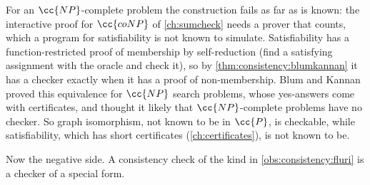 \begin{refsection}
For an $\cc{NP}$-complete problem the construction fails as far as is known: the interactive proof for $\cc{coNP}$ of \cref{ch:sumcheck} needs a prover that counts, which a program for satisfiability is not known to simulate. Satisfiability has a function-restricted proof of membership by self-reduction (find a satisfying assignment with the oracle and check it), so by \cref{thm:consistency:blumkannan} it has a checker exactly when it has a proof of non-membership. Blum and Kannan proved this equivalence for $\cc{NP}$ search problems, whose yes-answers come with certificates, and thought it likely that $\cc{NP}$-complete problems have no checker. So graph isomorphism, not known to be in $\cc{P}$, is checkable, while satisfiability, which has short certificates (\cref{ch:certificates}), is not known to be.

Now the negative side. A consistency check of the kind in \cref{obs:consistency:fluri} is a checker of a special form.



\end{refsection}

